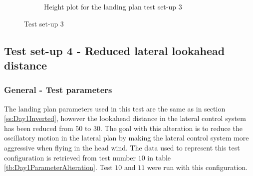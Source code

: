\begin{figure}[H]
\begin{subfigure}{0.7\textwidth}
\caption{Height plot for the landing plan test set-up 3}
\label{Fig:Height31mai125420}
\end{subfigure}
\caption{Test set-up 3}
\label{Fig:Test3}
\end{figure}

\subsection{Test set-up 4 - Reduced lateral lookahead distance}\label{ss:Day1:ReducedLookahead}
\subsubsection{General - Test parameters}
The landing plan parameters used in this test are the same as in section \ref{ss:Day1Inverted}, however the lookahead distance in the lateral control system has been reduced from $50$ to $30$. The goal with this alteration is to reduce the oscillatory motion in the lateral plan by making the lateral control system more aggressive when flying in the head wind. The data used to represent this test configuration is retrieved from test number $10$ in table \ref{tb:Day1ParameterAlteration}. Test $10$ and $11$ were run with this configuration.
